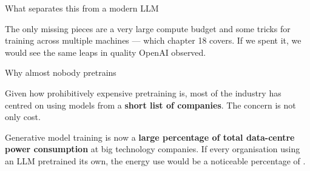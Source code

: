 \documentclass[aspectratio=169,11pt,t]{beamer}
\begin{document}
\begin{frame}[shrink=25]{What separates this from a modern LLM}
\begin{minipage}[t]{0.494\textwidth}
\end{minipage}%
\hfill
\begin{minipage}[t]{0.494\textwidth}
\end{minipage}%
{\fontsize{9.4}{12.6}\selectfont\color{fg2}The only missing pieces are a very large compute budget and some tricks for training across multiple machines --- which chapter 18 covers. If we spent it, we would see the same leaps in quality OpenAI observed.\par}\vskip 4pt
\end{frame}


\begin{frame}[shrink=25]{Why almost nobody pretrains}
{\fontsize{9.4}{12.6}\selectfont\color{fg2}Given how prohibitively expensive pretraining is, most of the industry has centred on using models from a \textbf{short list of companies}. The concern is not only cost.\par}\vskip 4pt
\begin{minipage}[t]{0.3253\textwidth}
\end{minipage}%
\hfill
\begin{minipage}[t]{0.3253\textwidth}
\end{minipage}%
\hfill
\begin{minipage}[t]{0.3253\textwidth}
\end{minipage}%
\begin{iband}[rose]
Generative model training is now a \textbf{large percentage of total data-centre power consumption} at big technology companies. If every organisation using an LLM pretrained its own, the energy use would be a noticeable percentage of .
\end{iband}
\end{frame}
\end{document}
